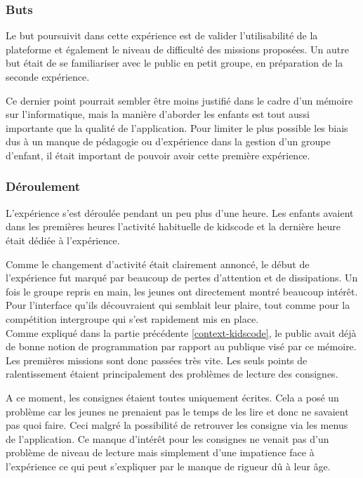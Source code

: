 \subsubsection{Buts}
Le but poursuivit dans cette expérience est de valider l'utilisabilité de la plateforme et également le niveau de difficulté des missions proposées. Un autre but était de se familiariser avec le public en petit groupe, en préparation de la seconde expérience.

Ce dernier point pourrait sembler être moins justifié dans le cadre d'un mémoire sur l'informatique, mais la manière d'aborder les enfants est tout aussi importante que la qualité de l'application. Pour limiter le plus possible les biais dus à un manque de pédagogie ou d'expérience dans la gestion d'un groupe d'enfant, il était important de pouvoir avoir cette première expérience.
\subsubsection{Déroulement}
L'expérience s'est déroulée pendant un peu plus d'une heure. Les enfants avaient dans les premières heures l'activité habituelle de kidscode et la dernière heure était dédiée à l'expérience. 

Comme le changement d'activité était clairement annoncé, le début de l'expérience fut marqué par beaucoup de pertes d'attention et de dissipations. Un fois le groupe repris en main, les jeunes ont directement montré beaucoup intérêt. Pour l'interface qu'ils découvraient qui semblait leur plaire, tout comme pour la compétition intergroupe qui s'est rapidement mis en place.\\

Comme expliqué dans la partie précédente \ref{context-kidscode}, le public avait déjà de bonne notion de programmation par rapport au publique visé par ce mémoire. Les premières missions sont donc passées très vite. Les seuls points de ralentissement étaient principalement des problèmes de lecture des consignes. 

A ce moment, les consignes étaient toutes uniquement écrites. Cela a posé un problème car les jeunes ne prenaient pas le temps de les lire et donc ne savaient pas quoi faire. Ceci malgré la possibilité de retrouver les consigne via les menus de l'application. Ce manque d'intérêt pour les consignes ne venait pas d'un problème de niveau de lecture mais simplement d'une impatience face à l'expérience ce qui peut s'expliquer par le manque de rigueur dû à leur âge.\\

